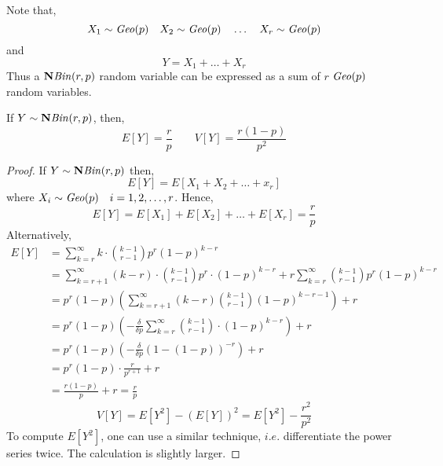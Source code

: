 \noindent
Note that,
\[ X_1 \sim \text{\emph{Geo}}(p) \quad X_2 \sim \text{\emph{Geo}}(p) \quad
   \dots \quad X_r \sim \text{\emph{Geo}}(p)                                   \]
and
\[ Y = X_1 + \dots + X_r                                                    \]
Thus a $\text{$\mathbf{N}$\emph{Bin}}(r, p)$ random variable can be expressed as a sum of
$r$ $\text{\emph{Geo}}(p)$ random variables. 

\begin{theorem}
    If $Y \sim \text{$\mathbf{N}$\emph{Bin}}(r, p)$, then,
    \[ E[Y] = \frac{r}{p} \qquad V[Y] = \frac{r(1 - p)}{p^2}                \]
\end{theorem}
\begin{proof}
    If $Y \sim \text{$\mathbf{N}$\emph{Bin}}(r, p)$ then,
    \[ E[Y] = E[X_1 + X_2 + \dots + x_r]                                    \]
    where $X_i \sim \text{\emph{Geo}}(p) \quad i = 1, 2, \dots, r$. Hence,
    \[ E[Y] = E[X_1] + E[X_2] + \dots + E[X_r]
            = \frac{r}{p}                                                   \]
    Alternatively,
    \begin{align*}
        E[Y] &= \sum_{k = r}^\infty k \cdot {{k - 1} \choose {r - 1}} p^r
                (1 - p)^{k - r}                                             \\
             &= \sum_{k = r + 1}^\infty (k - r) \cdot {{k - 1} \choose {r - 1}}
                p^r \cdot (1 - p)^{k - r} + r \sum_{k = r}^\infty {{k - 1} 
                \choose {r - 1}} p^r (1 - p)^{k - r}                        \\
             &= p^r (1 - p) (\sum_{k = r + 1}^\infty (k - r){{k - 1} \choose
                {r - 1}} (1 - p)^{k - r - 1}) + r                           \\
             &= p^r (1 - p) (- \frac{\delta}{\delta p} \sum_{k = r}^\infty
                {{k - 1} \choose {r - 1}} \cdot (1 - p)^{k - r}) + r        \\
             &= p^r (1 - p)(- \frac{\delta}{\delta p} (1 - (1 - p))^{-r})
                + r                                                         \\
             &= p^r (1 - p) \cdot \frac{r}{p^{r + 1}} + r                   \\
             &= \frac{r(1 - p)}{p} + r
              = \frac{r}{p}
    \end{align*}
    \[ V[Y] = E[Y^2] - (E[Y])^2 = E[Y^2] - \frac{r^2}{p^2}                  \]
    To compute $E[Y^2]$, one can use a similar technique, $i.e.$ differentiate
the power series twice. The calculation is slightly larger.
\end{proof}

